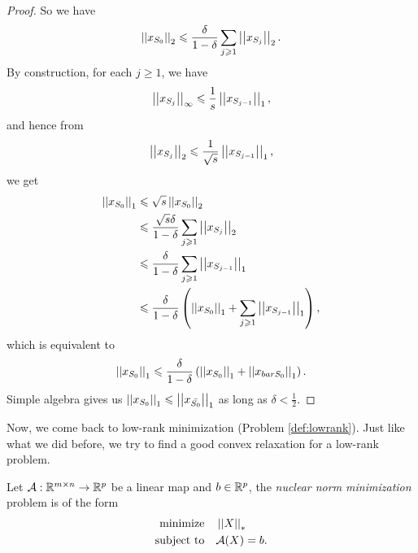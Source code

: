 \documentclass[11pt]{article}
\begin{document}
\begin{proof}
So we have
\[\left|\left|x_{S_0}\right|\right|_2\leqslant\frac{\delta}{1-\delta}\sum_{j\geqslant 1}\left|\left|x_{S_j}\right|\right|_2.\]
By construction, for each \(j \geqslant 1\), we have
\[\left|\left|x_{S_j}\right|\right|_\infty\leqslant\frac1s\left|\left|x_{S_{j-1}}\right|\right|_1,\]
and hence from
\[\left|\left|x_{S_j}\right|\right|_2\leqslant\frac{1}{\sqrt s}\left|\left|x_{S_{j-1}}\right|\right|_1,\]
we get
\[\begin{aligned}
    \left|\left|x_{S_0}\right|\right|_1
    &\leqslant \sqrt s\left|\left|x_{S_0}\right|\right|_2\\
    &\leqslant \frac{\sqrt s\delta}{1-\delta}\sum_{j\geqslant 1}\left|\left|x_{S_j}\right|\right|_2\\
    &\leqslant \frac{\delta}{1-\delta}\sum_{j\geqslant 1}\left|\left|x_{S_{j-1}}\right|\right|_1\\
    &\leqslant \frac{\delta}{1-\delta}\left(\left|\left|x_{S_0}\right|\right|_1+\sum_{j\geqslant 1}\left|\left|x_{S_{j-1}}\right|\right|_1\right),
\end{aligned}\]
which is equivalent to
\[\left|\left|x_{S_0}\right|\right|_1\leqslant\frac{\delta}{1-\delta}\left(\left|\left|x_{S_0}\right|\right|_1+\left|\left|x_{bar{S_0}}\right|\right|_1\right).\]
Simple algebra gives us \(\left|\left|x_{S_0}\right|\right|_1\leqslant\left|\left|x_{\bar{S_0}}\right|\right|_1\) as long as \(\delta<\frac{1}{2}\).
\end{proof}

Now, we come back to low-rank minimization (Problem \ref{def:lowrank}). Just like what we did before, we try to find a good convex relaxation for a low-rank problem. 

\begin{definition}
    Let \(\mathcal{A}:\mathbb R^{m\times n}\to \mathbb R^p\) be a linear map and \(b\in \mathbb R^p\), the \emph{nuclear norm minimization} problem is of the form 
    \[\begin{aligned}
        \textnormal{minimize}\quad & \left|\left|X\right|\right|_\ast\\
        \textnormal{subject to}\quad & \mathcal A(X)=b.
    \end{aligned}\]
\end{definition}
\end{document}
